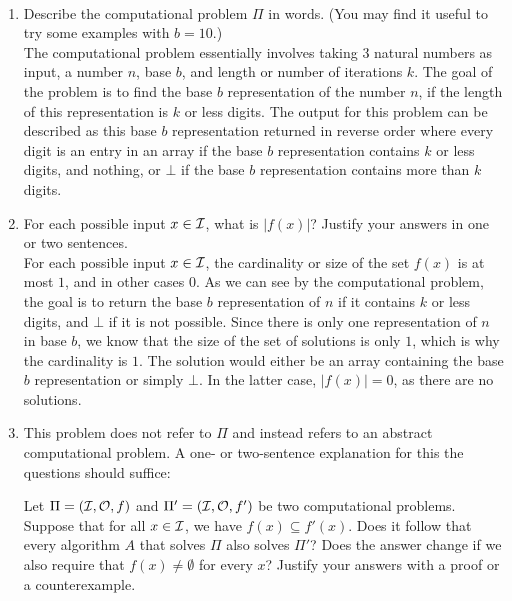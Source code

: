 \documentclass[11pt]{article}
\begin{document}
\begin{enumerate}
    
\begin{algorithm}[H]
    \\
    {
    \lElse{\Return{$\bot$}}}
\end{algorithm}


\begin{enumerate}
\item Describe the computational problem $\Pi$ in words.  (You may find it useful to try some examples with $b=10$.) \\ The computational problem essentially involves taking 3 natural numbers as input, a number $n$, base $b$, and length or number of iterations $k$. The goal of the problem is to find the base $b$ representation of the number $n$, if the length of this representation is $k$ or less digits. The output for this problem can be described as this base $b$ representation returned in reverse order where every digit is an entry in an array if the base $b$ representation contains $k$ or less digits, and nothing, or $\bot$ if the base $b$ representation contains more than $k$ digits. 
\item For each possible input $x\in \mathcal{I}$, what is $|f(x)|$?  Justify your answers in one or two sentences. \\

For each possible input $x\in \mathcal{I}$, the cardinality or size of the set $f(x)$ is at most $1$, and in other cases $0$. As we can see by the computational problem, the goal is to return the base $b$ representation of $n$ if it contains $k$ or less digits, and $\bot$ if it is not possible. Since there is only one representation of $n$ in base $b$, we know that the size of the set of solutions is only $1$, which is why the cardinality is $1$. The solution would either be an array containing the base $b$ representation or simply $\bot$. In the latter case, $|f(x)| = 0$, as there are no solutions. 

\item This problem does not refer to $\Pi$ and instead refers to an abstract computational problem. A one- or two-sentence explanation for this the questions should suffice:

Let $\Pi=(\mathcal{I},\mathcal{O},f)$ and $\Pi'=(\mathcal{I},\mathcal{O},f')$ be two computational problems.  Suppose that for all $x\in \mathcal{I}$, we have $f(x)\subseteq f'(x)$.  Does it follow that every algorithm $A$ that solves $\Pi$ also solves $\Pi'$?    Does the answer change if we also require that $f(x)\neq \emptyset$ for every $x$? Justify your answers with a proof or a counterexample. \\


\end{enumerate}
\end{enumerate}
\end{document}
